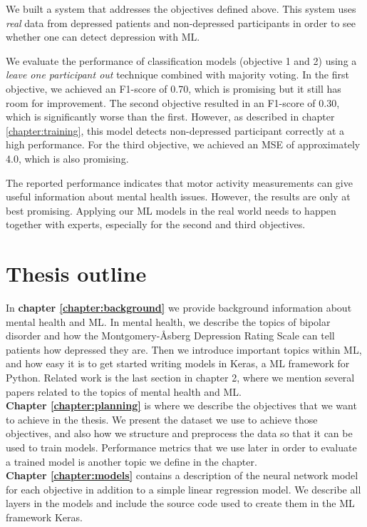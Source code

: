 We built a system that addresses the objectives defined above. This system uses \textit{real} data from depressed patients and non-depressed participants in order to see whether one can detect depression with ML.

We evaluate the performance of classification models (objective 1 and 2) using a \textit{leave one participant out} technique combined with majority voting. In the first objective, we achieved an F1-score of 0.70, which is promising but it still has room for improvement. The second objective resulted in an F1-score of 0.30, which is significantly worse than the first. However, as described in chapter \ref{chapter:training}, this model detects non-depressed participant correctly at a high performance. For the third objective, we achieved an MSE of approximately 4.0, which is also promising. 

The reported performance indicates that motor activity measurements can give useful information about mental health issues. However, the results are only at best promising. Applying our ML models in the real world needs to happen together with experts, especially for the second and third objectives. 

\section{Thesis outline}
In \textbf{chapter \ref{chapter:background}} we provide background information about mental health and ML. In mental health, we describe the topics of bipolar disorder and how the Montgomery-Åsberg Depression Rating Scale can tell patients how depressed they are. Then we introduce important topics within ML, and how easy it is to get started writing models in Keras, a ML framework for Python. Related work is the last section in chapter 2, where we mention several papers related to the topics of mental health and ML. \\

\noindent \textbf{Chapter \ref{chapter:planning}} is where we describe the objectives that we want to achieve in the thesis. We present the dataset we use to achieve those objectives, and also how we structure and preprocess the data so that it can be used to train models. Performance metrics that we use later in order to evaluate a trained model is another topic we define in the chapter.\\

\noindent \textbf{Chapter \ref{chapter:models}} contains a description of the neural network model for each objective in addition to a simple linear regression model. We describe all layers in the models and include the source code used to create them in the ML framework Keras. \\

